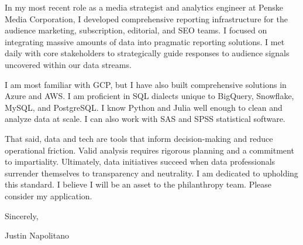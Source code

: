 \documentclass{cover-letter-class}
\begin{document}
{    \vspace{1em}

    In my most recent role as a media strategist and analytics engineer at Penske Media Corporation, I developed comprehensive reporting infrastructure for the audience marketing, subscription, editorial, and SEO teams. I focused on integrating massive amounts of data into pragmatic reporting solutions. I met daily with core stakeholders to strategically guide responses to audience signals uncovered within our data streams.  
    
    \vspace{1em}

    I am most familiar with GCP, but I have also built comprehensive solutions in Azure and AWS. I am proficient in SQL dialects unique to BigQuery, Snowflake, MySQL, and PostgreSQL. I know Python and Julia well enough to clean and analyze data at scale. I can also work with SAS and SPSS statistical software.  
    
    \vspace{1em}
    That said, data and tech are tools that inform decision-making and reduce operational friction. Valid analysis requires rigorous planning and a commitment to impartiality. Ultimately, data initiatives succeed when data professionals surrender themselves to transparency and neutrality. I am dedicated to upholding this standard. I believe I will be an asset to the philanthropy team. Please consider my application.


    
    \vspace{1em}
    


    
    \vspace{1em}


    \vspace{1em}

    \noindent
    Sincerely,

    \vspace{1em}

    \noindent
    Justin Napolitano
}
\end{document}
